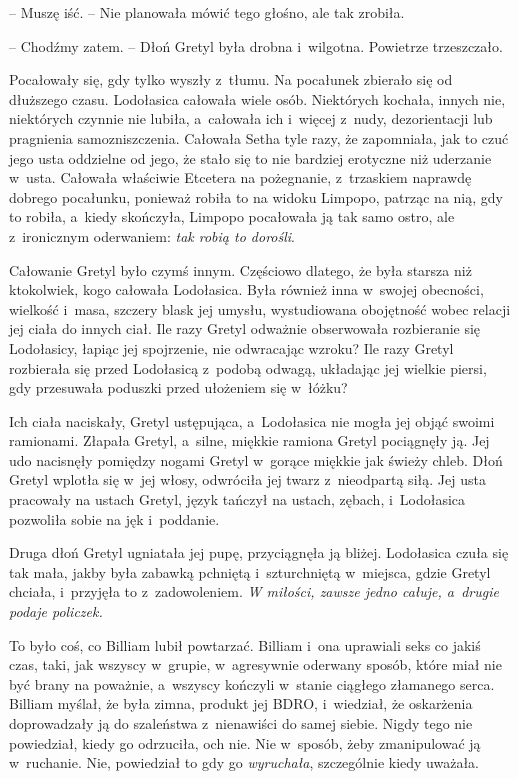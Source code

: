\documentclass[oneside,polish,11pt,sfheadings]{mwbk}
\begin{document}
-- Muszę iść. -- Nie planowała mówić tego głośno, ale tak zrobiła.

-- Chodźmy zatem. -- Dłoń Gretyl była drobna i~wilgotna. Powietrze
trzeszczało.

Pocałowały się, gdy tylko wyszły z~tłumu. Na pocałunek zbierało się od
dłuższego czasu. Lodołasica całowała wiele osób. Niektórych kochała,
innych nie, niektórych czynnie nie lubiła, a~całowała ich i~więcej z~nudy, dezorientacji lub pragnienia samozniszczenia. Całowała Setha tyle
razy, że zapomniała, jak to czuć jego usta oddzielne od jego, że stało
się to nie bardziej erotyczne niż uderzanie w~usta. Całowała właściwie
Etcetera na pożegnanie, z~trzaskiem naprawdę dobrego pocałunku, ponieważ
robiła to na widoku Limpopo, patrząc na nią, gdy to robiła, a~kiedy
skończyła, Limpopo pocałowała ją tak samo ostro, ale z~ironicznym
oderwaniem: \textit{tak robią to dorośli}.

Całowanie Gretyl było czymś innym. Częściowo dlatego, że była starsza
niż ktokolwiek, kogo całowała Lodołasica. Była również inna w~swojej
obecności, wielkość i~masa, szczery blask jej umysłu, wystudiowana
obojętność wobec relacji jej ciała do innych ciał. Ile razy Gretyl
odważnie obserwowała rozbieranie się Lodołasicy, łapiąc jej spojrzenie,
nie odwracając wzroku? Ile razy Gretyl rozbierała się przed Lodołasicą z~podobą odwagą, układając jej wielkie piersi, gdy przesuwała poduszki
przed ułożeniem się w~łóżku?

Ich ciała naciskały, Gretyl ustępująca, a~Lodołasica nie mogła jej objąć
swoimi ramionami. Złapała Gretyl, a~silne, miękkie ramiona Gretyl
pociągnęły ją. Jej udo nacisnęły pomiędzy nogami Gretyl w~gorące miękkie
jak świeży chleb. Dłoń Gretyl wplotła się w~jej włosy, odwróciła jej
twarz z~nieodpartą siłą. Jej usta pracowały na ustach Gretyl, język
tańczył na ustach, zębach, i~Lodołasica pozwoliła sobie na jęk i~poddanie.

Druga dłoń Gretyl ugniatała jej pupę, przyciągnęła ją bliżej. Lodołasica
czuła się tak mała, jakby była zabawką pchniętą i~szturchniętą w~miejsca, gdzie Gretyl chciała, i~przyjęła to z~zadowoleniem. \textit{W
miłości, zawsze jedno całuje, a~drugie podaje policzek.}

To było coś, co Billiam lubił powtarzać. Billiam i~ona uprawiali seks co
jakiś czas, taki, jak wszyscy w~grupie, w~agresywnie oderwany sposób,
które miał nie być brany na poważnie, a~wszyscy kończyli w~stanie
ciągłego złamanego serca. Billiam myślał, że była zimna, produkt jej
BDRO, i~wiedział, że oskarżenia doprowadzały ją do szaleństwa z~nienawiści do samej siebie. Nigdy tego nie powiedział, kiedy go
odrzuciła, och nie. Nie w~sposób, żeby zmanipulować ją w~ruchanie. Nie,
powiedział to gdy go \textit{wyruchała}, szczególnie kiedy uważała. 
\end{document}
